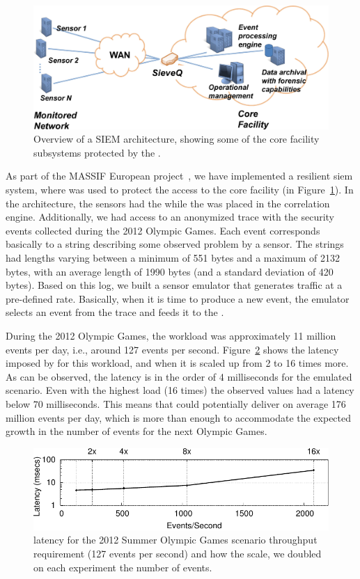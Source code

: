 \begin{figure}[!t]
\centering
\includegraphics[width=0.65\columnwidth]{images/images/SIEM.pdf}
\caption{\small Overview of a SIEM architecture, showing some of the core facility subsystems protected by the \sieveq.}
\label{fig:siem}
\end{figure}

As part of the MASSIF European project~\cite{Vianello:2013}, we have implemented a resilient \gls{siem} system, where \sieveq was used to protect the access to the core facility (in Figure~\ref{fig:siem}).
In the \sieveq architecture, the sensors had the \sender while the \postsieve was placed in the correlation engine.
Additionally, we had access to an anonymized trace with the security events collected during the 2012 Olympic Games.
Each event corresponds basically to a string describing some observed problem by a sensor. The strings had lengths varying between a minimum of 551 bytes and a maximum of 2132 bytes, with an average length of 1990 bytes (and a standard deviation of 420 bytes). Based on this log, we built a sensor emulator that generates traffic at a pre-defined rate. Basically, when it is time to produce a new event, the emulator selects an event from the trace and feeds it to the \sender.

During the 2012 Olympic Games, the workload was approximately 11 million events per day, i.e., around 127 events per second.
Figure~\ref{fig:massif} shows the latency imposed by \sieveq for this workload, and when it is scaled up from 2 to 16 times more. 
As can be observed, the latency is in the order of 4 milliseconds for the emulated scenario.
Even with the highest load (16 times) the observed values had a latency below $70$ milliseconds.
This means that \sieveq could potentially deliver on average 176 million events per day, which is more than enough to accommodate the expected growth in the number of events for the next Olympic Games.

\begin{figure}[!t]
\centering
\includegraphics[width=\columnwidth]{images/gnuplot/sieveq/new_massif/massif.pdf}
\caption{\small \sieveq latency for the 2012 Summer Olympic Games scenario throughput requirement (127 events per second) and how the \sieveq scale, we doubled on each experiment the number of events.}
\label{fig:massif}
\end{figure}

